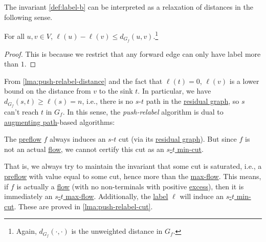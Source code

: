 The invariant \autoref{def:label-b} can be interpreted as a relaxation of distances in the following sense.

\begin{lemma}\label{lma:push-relabel-distance}
	For all \(u, v \in V\), \(\ell (u) - \ell (v) \leq d_{G_f}(u, v)\).\footnote{Again, \(d_{G_f}(\cdot, \cdot)\) is the unweighted distance in \(G_f\).}
\end{lemma}
\begin{proof}
	This is because we restrict that any forward edge can only have label more than \(1\).
\end{proof}

From \autoref{lma:push-relabel-distance} and the fact that \(\ell (t) = 0\), \(\ell (v)\) is a lower bound on the distance from \(v\) to the sink \(t\). In particular, we have \(d_{G_f}(s, t) \geq \ell (s) = n\), i.e., there is no \(s\)-\(t\) path in the \hyperref[def:residual-graph]{residual graph}, so \(s\) can't reach \(t\) in \(G_f\). In this sense, the \emph{push-relabel} algorithm is dual to \hyperref[def:augmenting-path]{augmenting path}-based algorithms:

\begin{intuition}
	The \hyperref[def:preflow]{preflow} \(f\) always induces an \(s\)-\(t\) cut (via its \hyperref[def:residual-graph]{residual graph}). But since \(f\) is not an actual \hyperref[def:flow]{flow}, we cannot certify this cut as an \hyperref[prb:s-t-min-cut]{\(s\)-\(t\) min-cut}.
\end{intuition}

That is, we always try to maintain the invariant that some cut is saturated, i.e., a \hyperref[def:preflow]{preflow} with value equal to some cut, hence more than the \hyperref[prb:s-t-max-flow]{max-flow}. This means, if \(f\) is actually a \hyperref[def:flow]{flow} (with no non-terminals with positive \hyperref[def:excess]{excess}), then it is immediately an \hyperref[prb:s-t-max-flow]{\(s\)-\(t\) max-flow}. Additionally, the \hyperref[def:label]{label} \(\ell \) will induce an \hyperref[prb:s-t-min-cut]{\(s\)-\(t\) min-cut}. These are proved in \autoref{lma:push-relabel-cut}.

